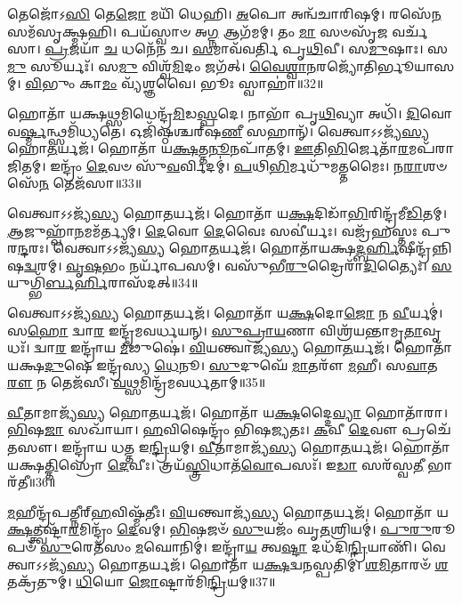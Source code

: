 𑌤𑍇𑌜𑍋᳴𑌽\-\ul{𑌸𑌿} 𑌤𑍇\-\ul{𑌜𑍋} 𑌮𑌯𑌿᳴ 𑌧𑍇𑌹𑌿।
\-\ul{𑌅}\-𑌪𑍋 𑌅𑌨𑍍𑌵᳴𑌚𑌾𑌰𑌿𑌷𑌮𑍍।
𑌰𑌸𑍇᳴\-\ul{𑌨} 𑌸𑌮᳴𑌸𑍃𑌕𑍍𑌷𑍍𑌮𑌹𑌿।
𑌪𑌯᳴𑌸𑍍𑌵𑌾𑍞 𑌅\-\ul{𑌗𑍍𑌨} 𑌆𑌗᳴𑌮𑌮𑍍।
𑌤𑌂 \ul{𑌮𑌾} 𑌸𑍞𑌸𑍃᳴\-\ul{𑌜} 𑌵𑌰𑍍𑌚᳴𑌸𑌾।
\-\ul{𑌪𑍍𑌰}\-𑌜𑌯𑌾᳴ \ul{𑌚} 𑌧𑌨𑍇᳴𑌨 𑌚।
\-\ul{𑌸}\-𑌮𑌾𑌵᳴𑌵𑌰𑍍𑌤𑌿 𑌪𑍃\-\ul{𑌥𑌿}\-𑌵𑍀।
𑌸\-\ul{𑌮𑍁}\-𑌷𑌾𑌃।
𑌸\-\ul{𑌮𑍁} 𑌸𑍂𑌰𑍍𑌯𑌃᳴।
𑌸\-\ul{𑌮𑍁} 𑌵𑌿𑌶𑍍𑌵᳴\-\ul{𑌮𑌿}\-𑌦𑌂 𑌜𑌗᳴𑌤𑍍।
\-\ul{𑌵𑍈}\-\-\ul{𑌶𑍍𑌵𑌾}\-\-\ul{𑌨}\-𑌰𑌜𑍍𑌯𑍋᳴𑌤𑌿𑌰𑍍𑌭𑍂𑌯𑌾𑌸𑌮𑍍।
\-\ul{𑌵𑌿}\-𑌭𑍁𑌂 𑌕𑌾\-\ul{𑌮𑌂} 𑌵𑍍𑌯᳴𑌶𑍍𑌞𑌵𑍈।
𑌭𑍂𑌃 𑌸𑍍𑌵𑌾𑌹𑌾॑॥32॥\anuvakamend[𑌸𑍍𑌵\-\ul{𑌪𑍍𑌨} 𑌏𑌨𑌾𑍞᳴𑌸𑌿 𑌚\-\ul{𑌕𑍃}\-𑌮𑌾 \ul{𑌵}\-𑌯𑌂 𑌮𑍁᳴\-\ul{𑌞𑍍𑌚} 𑌮𑌲𑌾᳴𑌦𑌿𑌵 \ul{𑌸}\-𑌮𑌿𑌦᳴\-\ul{𑌸𑌿} 𑌜\-\ul{𑌗}\-𑌤𑍍𑌰𑍀𑌣𑌿᳴ 𑌚]

𑌹𑍋𑌤𑌾᳴ 𑌯𑌕𑍍𑌷\-\ul{𑌥𑍍𑌸}\-𑌮𑌿𑌧𑍇𑌨𑍍𑌦𑍍𑌰᳴\-\ul{𑌮𑌿}\-𑌡\-\ul{𑌸𑍍𑌪}\-𑌦𑍇।
𑌨𑌾𑌭𑌾᳴ 𑌪𑍃\-\ul{𑌥𑌿}\-𑌵𑍍𑌯𑌾 𑌅𑌧𑌿᳴।
\-\ul{𑌦𑌿}\-𑌵𑍋 𑌵\-\ul{𑌰𑍍𑌷𑍍𑌮}\-𑌨𑍍𑌥𑍍𑌸𑌮𑌿᳴𑌧𑍍𑌯𑌤𑍇।
𑌓𑌜𑌿᳴𑌷𑍍𑌠𑌶𑍍𑌚𑌰𑍍‌\mbox{}𑌷\-\ul{𑌣𑍀} 𑌸𑌹𑌾𑌨𑍍᳴।
𑌵𑍇𑌤𑍍𑌵𑌾𑌽𑌽𑌜𑍍𑌯᳴\-\ul{𑌸𑍍𑌯} 𑌹𑍋\-\ul{𑌤}\-𑌰𑍍𑌯𑌜᳴।
𑌹𑍋𑌤𑌾᳴ 𑌯\-\ul{𑌕𑍍𑌷}\-𑌤𑍍𑌤\-\ul{𑌨𑍂}\-𑌨𑌪𑌾᳴𑌤𑌮𑍍।
\-\ul{𑌊}\-𑌤𑌿\-\ul{𑌭𑌿}\-𑌰𑍍𑌜𑍇𑌤𑌾᳴\-\ul{𑌰}\-𑌮𑌪᳴𑌰𑌾𑌜𑌿𑌤𑌮𑍍।
𑌇𑌨𑍍𑌦𑍍𑌰𑌂᳴ \ul{𑌦𑍇}\-𑌵𑍞 𑌸𑍁᳴\-\ul{𑌵}\-𑌰𑍍𑌵𑌿𑌦𑌮𑍍॑।
\-\ul{𑌪}\-𑌥𑌿\-\ul{𑌭𑌿}\-𑌰𑍍𑌮𑌧𑍁᳴𑌮𑌤𑍍𑌤𑌮𑍈𑌃।
𑌨\-\ul{𑌰𑌾}\-𑌶𑍞𑌸𑍇᳴\-\ul{𑌨} 𑌤𑍇𑌜᳴𑌸𑌾॥33॥

𑌵𑍇𑌤𑍍𑌵𑌾𑌽𑌽𑌜𑍍𑌯᳴\-\ul{𑌸𑍍𑌯} 𑌹𑍋\-\ul{𑌤}\-𑌰𑍍𑌯𑌜᳴।
𑌹𑍋𑌤𑌾᳴ 𑌯\-\ul{𑌕𑍍𑌷}\-𑌦𑌿𑌡𑌾᳴\-\ul{𑌭𑌿}\-𑌰𑌿𑌨𑍍𑌦𑍍𑌰᳴𑌮𑍀\-\ul{𑌡𑌿}\-𑌤𑌮𑍍।
\-\ul{𑌆}\-𑌜𑍁𑌹𑍍𑌵𑌾᳴\-\ul{𑌨}\-𑌮𑌮᳴𑌰𑍍𑌤𑍍𑌯𑌮𑍍।
\-\ul{𑌦𑍇}\-𑌵𑍋 \ul{𑌦𑍇}\-𑌵𑍈𑌃 𑌸𑌵𑍀॑𑌰𑍍𑌯𑌃।
𑌵𑌜𑍍𑌰᳴𑌹𑌸𑍍𑌤𑌃 𑌪𑍁𑌰\-\ul{𑌨𑍍𑌦}\-𑌰𑌃।
𑌵𑍇𑌤𑍍𑌵𑌾𑌽𑌽𑌜𑍍𑌯᳴\-\ul{𑌸𑍍𑌯} 𑌹𑍋\-\ul{𑌤}\-𑌰𑍍𑌯𑌜᳴।
𑌹𑍋𑌤𑌾᳴𑌯𑌕𑍍𑌷\-\ul{𑌦𑍍𑌬}\-\-\ul{𑌰𑍍}\-𑌹𑌿𑌷𑍀𑌨𑍍𑌦𑍍𑌰᳴𑌨𑍍𑌨𑌿𑌷\-\ul{𑌦𑍍𑌵}\-𑌰𑌮𑍍।
\-\ul{𑌵𑍃}\-\-\ul{𑌷}\-𑌭𑌂 𑌨𑌰𑍍𑌯𑌾᳴𑌪𑌸𑌮𑍍।
𑌵𑌸𑍁᳴𑌭𑍀\-\ul{𑌰𑍁}\-𑌦𑍍𑌰𑍈𑌰𑌾᳴\-\ul{𑌦𑌿}\-𑌤𑍍𑌯𑍈𑌃।
\-\ul{𑌸}\-𑌯𑍁𑌗𑍍𑌭𑌿᳴\-\ul{𑌰𑍍𑌬}\-\-\ul{𑌰𑍍}\-𑌹𑌿𑌰𑌾\-𑌸᳴𑌦𑌤𑍍॥34॥

𑌵𑍇𑌤𑍍𑌵𑌾𑌽𑌽𑌜𑍍𑌯᳴\-\ul{𑌸𑍍𑌯} 𑌹𑍋\-\ul{𑌤}\-𑌰𑍍𑌯𑌜᳴।
𑌹𑍋𑌤𑌾᳴ 𑌯\-\ul{𑌕𑍍𑌷}\-𑌦𑍋\-\ul{𑌜𑍋} 𑌨 \ul{𑌵𑍀}\-𑌰𑍍𑌯𑌮𑍍॑।
𑌸\-\ul{𑌹𑍋} 𑌦𑍍𑌵𑌾\-\ul{𑌰} 𑌇𑌨𑍍𑌦𑍍𑌰᳴𑌮𑌵𑌰𑍍𑌧𑌯𑌨𑍍।
\-\ul{𑌸𑍁}\-\-\ul{𑌪𑍍𑌰𑌾}\-\-\ul{𑌯}\-𑌣𑌾 𑌵𑌿𑌶𑍍𑌰᳴𑌯𑌨𑍍𑌤𑌾𑌮𑍃\-\ul{𑌤𑌾}\-𑌵𑍃𑌧𑌃᳴।
𑌦𑍍𑌵𑌾\-\ul{𑌰} 𑌇𑌨𑍍𑌦𑍍𑌰𑌾᳴𑌯 \ul{𑌮𑍀}\-𑌢𑍁𑌷𑍇॑।
\-\ul{𑌵𑌿}\-𑌯𑌨𑍍𑌤𑍍𑌵𑌾𑌜𑍍𑌯᳴\-\ul{𑌸𑍍𑌯} 𑌹𑍋\-\ul{𑌤}\-𑌰𑍍𑌯𑌜᳴।
𑌹𑍋𑌤𑌾᳴ 𑌯𑌕𑍍𑌷\-\ul{𑌦𑍁}\-𑌷𑍇 𑌇𑌨𑍍𑌦𑍍𑌰᳴𑌸𑍍𑌯 \ul{𑌧𑍇}\-𑌨𑍂।
\-\ul{𑌸𑍁}\-𑌦𑍁𑌘𑍇᳴ \ul{𑌮𑌾}\-𑌤𑌰𑍗᳴ \ul{𑌮}\-𑌹𑍀।
𑌸\-\ul{𑌵𑌾}\-𑌤\-\ul{𑌰𑍗} 𑌨 𑌤𑍇𑌜᳴𑌸𑍀।
\-\ul{𑌵}\-𑌥𑍍𑌸𑌮𑌿𑌨𑍍𑌦𑍍𑌰᳴𑌮𑌵𑌰𑍍𑌧𑌤𑌾𑌮𑍍॥35॥

\-\ul{𑌵𑍀}\-𑌤𑌾𑌮𑌾𑌜𑍍𑌯᳴\-\ul{𑌸𑍍𑌯} 𑌹𑍋\-\ul{𑌤}\-𑌰𑍍𑌯𑌜᳴।
𑌹𑍋𑌤𑌾᳴ 𑌯\-\ul{𑌕𑍍𑌷}\-𑌦𑍍𑌦𑍈\-\ul{𑌵𑍍𑌯𑌾} 𑌹𑍋𑌤𑌾᳴𑌰𑌾।
\-\ul{𑌭𑌿}\-𑌷\-\ul{𑌜𑌾} 𑌸𑌖𑌾᳴𑌯𑌾।
\-\ul{𑌹}\-𑌵𑌿𑌷𑍇𑌨𑍍𑌦𑍍𑌰𑌂᳴ 𑌭𑌿𑌷𑌜𑍍𑌯𑌤𑌃।
\-\ul{𑌕}\-𑌵𑍀 \ul{𑌦𑍇}\-𑌵𑍗 𑌪𑍍𑌰𑌚𑍇᳴𑌤𑌸𑍗।
𑌇𑌨𑍍𑌦𑍍𑌰𑌾᳴𑌯 𑌧𑌤𑍍𑌤 𑌇\-\ul{𑌨𑍍𑌦𑍍𑌰𑌿}\-𑌯𑌮𑍍।
\-\ul{𑌵𑍀}\-𑌤𑌾𑌮𑌾𑌜𑍍𑌯᳴\-\ul{𑌸𑍍𑌯} 𑌹𑍋\-\ul{𑌤}\-𑌰𑍍𑌯𑌜᳴।
𑌹𑍋𑌤𑌾᳴ 𑌯𑌕𑍍𑌷\-\ul{𑌤𑍍𑌤𑌿}\-𑌸𑍍𑌰𑍋 \ul{𑌦𑍇}\-𑌵𑍀𑌃।
𑌤𑍍𑌰𑌯᳴\-\ul{𑌸𑍍𑌤𑍍𑌰𑌿}\-𑌧𑌾𑌤᳴\-\ul{𑌵𑍋}\-𑌪𑌸𑌃᳴।
𑌇\-\ul{𑌡𑌾} 𑌸𑌰᳴𑌸𑍍𑌵\-\ul{𑌤𑍀} 𑌭𑌾𑌰᳴𑌤𑍀॥36॥

\-\ul{𑌮}\-𑌹𑍀𑌨𑍍𑌦𑍍𑌰᳴𑌪𑌤𑍍𑌨𑍀𑌰𑍍‌\mbox{}\-\ul{𑌹}\-𑌵𑌿𑌷𑍍𑌮᳴𑌤𑍀𑌃।
\-\ul{𑌵𑌿}\-𑌯𑌨𑍍𑌤𑍍𑌵𑌾𑌜𑍍𑌯᳴\-\ul{𑌸𑍍𑌯} 𑌹𑍋\-\ul{𑌤}\-𑌰𑍍𑌯𑌜᳴।
𑌹𑍋𑌤𑌾᳴ 𑌯\-\ul{𑌕𑍍𑌷}\-𑌤𑍍𑌤𑍍𑌵𑌷𑍍𑌟𑌾᳴\-\ul{𑌰}\-𑌮𑌿𑌨𑍍𑌦𑍍𑌰𑌂᳴ \ul{𑌦𑍇}\-𑌵𑌮𑍍।
\-\ul{𑌭𑌿}\-𑌷𑌜𑍞᳴ \ul{𑌸𑍁}\-𑌯𑌜𑌂᳴ 𑌘𑍃\-\ul{𑌤}\-𑌶𑍍𑌰𑌿𑌯𑌮𑍍॑।
\-\ul{𑌪𑍁}\-\-\ul{𑌰𑍁}\-𑌰𑍂𑌪𑍞᳴ \ul{𑌸𑍁}\-𑌰𑍇𑌤᳴𑌸𑌂 \ul{𑌮}\-𑌘𑍋𑌨𑌿𑌮𑍍॑।
𑌇𑌨𑍍𑌦𑍍𑌰𑌾᳴\-\ul{𑌯} 𑌤𑍍𑌵\-\ul{𑌷𑍍𑌟𑌾} 𑌦𑌧᳴𑌦𑌿\-\ul{𑌨𑍍𑌦𑍍𑌰𑌿}\-𑌯𑌾𑌣𑌿᳴।
𑌵𑍇𑌤𑍍𑌵𑌾𑌽𑌽𑌜𑍍𑌯᳴\-\ul{𑌸𑍍𑌯} 𑌹𑍋\-\ul{𑌤}\-𑌰𑍍𑌯𑌜᳴।
𑌹𑍋𑌤𑌾᳴ 𑌯\-\ul{𑌕𑍍𑌷}\-𑌦𑍍𑌵\-\ul{𑌨}\-𑌸𑍍𑌪𑌤𑌿𑌮𑍍॑।
\-\ul{𑌶}\-\-\ul{𑌮𑌿}\-𑌤𑌾𑌰𑍞᳴ \ul{𑌶}\-𑌤𑌕𑍍𑌰᳴𑌤𑍁𑌮𑍍।
\-\ul{𑌧𑌿}\-𑌯𑍋 \ul{𑌜𑍋}\-𑌷𑍍𑌟𑌾𑌰᳴𑌮𑌿\-\ul{𑌨𑍍𑌦𑍍𑌰𑌿}\-𑌯𑌮𑍍॥37॥

